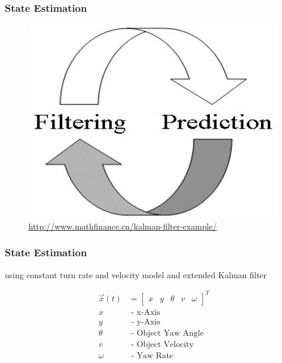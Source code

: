 \documentclass[nosymbols]{beamer}	%
\begin{document}
\begin{frame}
\frametitle{State Estimation}
\begin{figure}[!ht]
\begin{center}
\includegraphics[width=\textwidth,height=0.7\textheight,keepaspectratio]{bilder/kalmanfilter-1.jpg}\\
\tiny{\url{http://www.mathfinance.cn/kalman-filter-example/}}
\end{center}
\end{figure}
\end{frame}


\begin{frame}
\frametitle{State Estimation}
using constant turn rate and velocity model and extended Kalman filter

\begin{align*}
\vec{x}(t) &=
\begin{bmatrix}
x & y & \theta & v & \omega
\end{bmatrix}^T\\
x &\text{ - x-Axis}\\
y &\text{ - y-Axis}\\
\theta &\text{ - Object Yaw Angle}\\
v &\text{ - Object Velocity}\\
\omega &\text{ - Yaw Rate}
\end{align*}

\end{frame}
\end{document}
